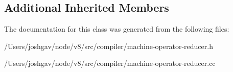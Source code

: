 \subsection*{Additional Inherited Members}


The documentation for this class was generated from the following files\+:\begin{DoxyCompactItemize}
\item 
/\+Users/joshgav/node/v8/src/compiler/machine-\/operator-\/reducer.\+h\item 
/\+Users/joshgav/node/v8/src/compiler/machine-\/operator-\/reducer.\+cc\end{DoxyCompactItemize}
